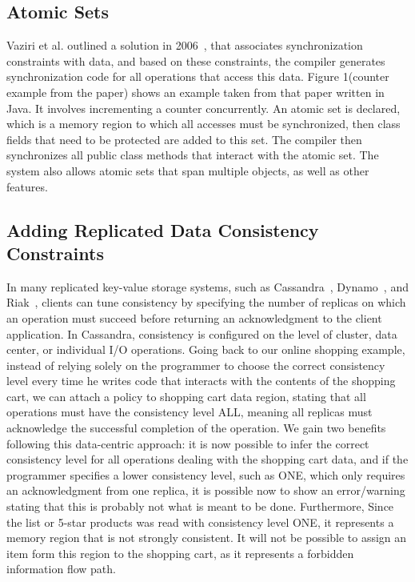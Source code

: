 \documentclass[]{usiinfprospectus}
\begin{document}
\subsection{Atomic Sets}
Vaziri et al. outlined a solution in 2006~\cite{Vaziri:2006:ASC:1111320.1111067}, that associates synchronization constraints with data, and based on these constraints, the compiler generates synchronization code for all operations that access this data. Figure 1(counter example from the paper) shows an example taken from that paper written in Java. It involves incrementing a counter concurrently. An atomic set is declared, which is a memory region to which all accesses must be synchronized, then class fields that need to be protected are added to this set. The compiler then synchronizes all public class methods that interact with the atomic set. The system also allows atomic sets that span multiple objects, as well as other features. 

\subsection{Adding Replicated Data Consistency Constraints}

In many replicated key-value storage systems, such as Cassandra~\cite{lakshman2010cassandra}, Dynamo~\cite{hastorun2007dynamo}, and Riak~\cite{redmond2012seven}, clients can tune consistency by specifying the number of replicas on which an operation must succeed before returning an acknowledgment to the client application. In Cassandra, consistency is configured on the level of cluster, data center, or individual I/O operations. Going back to our online shopping example, instead of relying solely on the programmer to choose the correct consistency level every time he writes code that interacts with the contents of the shopping cart, we can attach a policy to shopping cart data region, stating that all operations must have the consistency level ALL, meaning all replicas must acknowledge the successful completion of the operation. We gain two benefits following this data-centric approach: it is now possible to infer the correct consistency level for all operations dealing with the shopping cart data, and if the programmer specifies a lower consistency level, such as ONE, which only requires an acknowledgment from one replica, it is possible now to show an error/warning stating that this is probably not what is meant to be done. Furthermore, Since the list or 5-star products was read with consistency level ONE, it represents a memory region that is not strongly consistent. It will not be possible to assign an item form this region to the shopping cart, as it represents a forbidden information flow path. 
\end{document}
